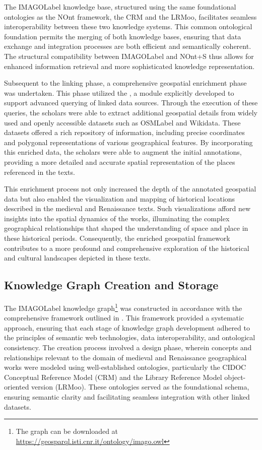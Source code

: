 The \acrshort{IMAGOLabel} knowledge base, structured using the same foundational ontologies as the NOnt framework, the CRM and the LRMoo, facilitates seamless interoperability between these two knowledge systems. This common ontological foundation permits the merging of both knowledge bases, ensuring that data exchange and integration processes are both efficient and semantically coherent. The structural compatibility between \acrshort{IMAGOLabel} and NOnt+S thus allows for enhanced information retrieval and more sophisticated knowledge representation.

Subsequent to the linking phase, a comprehensive geospatial enrichment phase was undertaken. This phase utilized the , a module explicitly developed to support advanced querying of linked data sources. Through the execution of these queries, the scholars were able to extract additional geospatial details from widely used and openly accessible datasets such as \acrshort{OSMLabel} and Wikidata. These datasets offered a rich repository of information, including precise coordinates and polygonal representations of various geographical features. By incorporating this enriched data, the scholars were able to augment the initial annotations, providing a more detailed and accurate spatial representation of the places referenced in the texts.

This enrichment process not only increased the depth of the annotated geospatial data but also enabled the visualization and mapping of historical locations described in the medieval and Renaissance texts. Such visualizations afford new insights into the spatial dynamics of the works, illuminating the complex geographical relationships that shaped the understanding of space and place in these historical periods. Consequently, the enriched geospatial framework contributes to a more profound and comprehensive exploration of the historical and cultural landscapes depicted in these texts.


\subsection{Knowledge Graph Creation and Storage}\label{VII-subsec:imago-kg}

The \acrshort{IMAGOLabel} knowledge graph\footnote{The graph can be downloaded at \url{https://geosparql.isti.cnr.it/ontology/imago.owl}} was constructed in accordance with the comprehensive framework outlined in  . This framework provided a systematic approach, ensuring that each stage of knowledge graph development adhered to the principles of semantic web technologies, data interoperability, and ontological consistency. The creation process involved a design phase, wherein concepts and relationships relevant to the domain of medieval and Renaissance geographical works were modeled using well-established ontologies, particularly the CIDOC Conceptual Reference Model (CRM) and the Library Reference Model object-oriented version (LRMoo). These ontologies served as the foundational schema, ensuring semantic clarity and facilitating seamless integration with other linked datasets.

